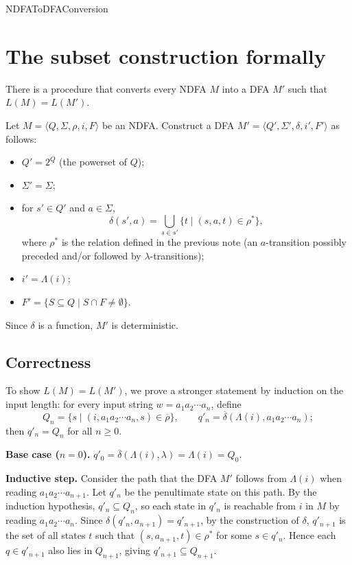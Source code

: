 \documentclass[hidelinks]{article}
\begin{document}
\begin{smodule}[title={NDFA to DFA Conversion}]{NDFAToDFAConversion}
\section{The subset construction formally}

\begin{sparagraph}[title={Theorem (NDFA-to-DFA conversion)}]
There is a procedure that converts every NDFA $M$ into a DFA $M'$ such that $L(M) = L(M')$.
\end{sparagraph}

\begin{sparagraph}[title={Construction}]
Let $M = \langle Q, \Sigma, \rho, i, F \rangle$ be an NDFA. Construct a DFA $M' = \langle Q', \Sigma', \delta, i', F' \rangle$ as follows:
\begin{itemize}
  \item $Q' = 2^Q$ (the powerset of $Q$);
  \item $\Sigma' = \Sigma$;
  \item for $s' \in Q'$ and $a \in \Sigma$,
  \[
  \delta(s', a) = \bigcup_{s \in s'} \{ t \mid (s, a, t) \in \rho^* \},
  \]
  where $\rho^*$ is the relation defined in the previous note (an $a$-transition possibly preceded and/or followed by $\lambda$-transitions);
  \item $i' = \Lambda(i)$;
  \item $F' = \{ S \subseteq Q \mid S \cap F \neq \emptyset \}$.
\end{itemize}
Since $\delta$ is a function, $M'$ is deterministic.
\end{sparagraph}

\subsection{Correctness}

To show $L(M) = L(M')$, we prove a stronger statement by induction on the input length: for every input string $w = a_1 a_2 \cdots a_n$, define
\[
Q_n = \{ s \mid (i, a_1 a_2 \cdots a_n, s) \in \overline{\rho} \}, \qquad q'_n = \overline{\delta}(\Lambda(i), a_1 a_2 \cdots a_n);
\]
then $q'_n = Q_n$ for all $n \geq 0$.

\begin{sparagraph}[title={Proof: $q'_n \subseteq Q_n$}]
\textbf{Base case ($n = 0$).} $q'_0 = \overline{\delta}(\Lambda(i), \lambda) = \Lambda(i) = Q_0$.

\textbf{Inductive step.} Consider the path that the DFA $M'$ follows from $\Lambda(i)$ when reading $a_1 a_2 \cdots a_{n+1}$. Let $q'_n$ be the penultimate state on this path. By the induction hypothesis, $q'_n \subseteq Q_n$, so each state in $q'_n$ is reachable from $i$ in $M$ by reading $a_1 a_2 \cdots a_n$. Since $\delta(q'_n, a_{n+1}) = q'_{n+1}$, by the construction of $\delta$, $q'_{n+1}$ is the set of all states $t$ such that $(s, a_{n+1}, t) \in \rho^*$ for some $s \in q'_n$. Hence each $q \in q'_{n+1}$ also lies in $Q_{n+1}$, giving $q'_{n+1} \subseteq Q_{n+1}$.
\end{sparagraph}


\end{smodule}
\end{document}
